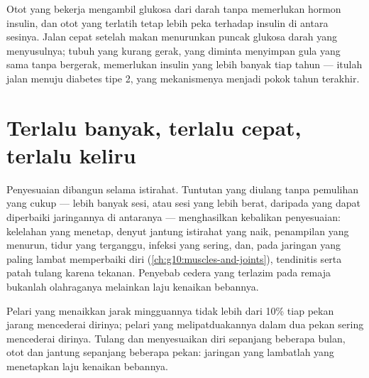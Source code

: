 \begin{example}\label{ex:g10:sport-and-health:sugar}
Otot yang bekerja mengambil glukosa dari darah tanpa memerlukan hormon
insulin, dan otot yang terlatih tetap lebih peka terhadap insulin di
antara sesinya. Jalan cepat setelah makan menurunkan puncak glukosa
darah yang menyusulnya; tubuh yang kurang gerak, yang diminta menyimpan
gula yang sama tanpa bergerak, memerlukan insulin yang lebih banyak
tiap tahun --- itulah jalan menuju diabetes tipe 2, yang mekanismenya
menjadi pokok tahun terakhir.
\end{example}

\section{Terlalu banyak, terlalu cepat, terlalu keliru}

\begin{proposition}\label{prop:g10:sport-and-health:overtraining}
Penyesuaian dibangun selama istirahat. Tuntutan yang diulang tanpa
pemulihan yang cukup --- lebih banyak sesi, atau sesi yang lebih berat,
daripada yang dapat diperbaiki jaringannya di antaranya ---
menghasilkan kebalikan penyesuaian: kelelahan yang menetap, denyut
jantung istirahat yang naik, penampilan yang menurun, tidur yang
terganggu, infeksi yang sering, dan, pada jaringan yang paling lambat
memperbaiki diri (\cref{ch:g10:muscles-and-joints}), tendinitis serta
patah tulang karena tekanan. Penyebab cedera yang terlazim pada remaja
bukanlah olahraganya melainkan laju kenaikan bebannya.
\end{proposition}
\admitted

\begin{example}\label{ex:g10:sport-and-health:tenpercent}
Pelari yang menaikkan jarak mingguannya tidak lebih dari 10\% tiap
pekan jarang mencederai dirinya; pelari yang melipatduakannya dalam dua
pekan sering mencederai dirinya. Tulang dan  menyesuaikan diri
sepanjang beberapa bulan, otot dan jantung sepanjang beberapa pekan:
jaringan yang lambatlah yang menetapkan laju kenaikan bebannya.
\end{example}

